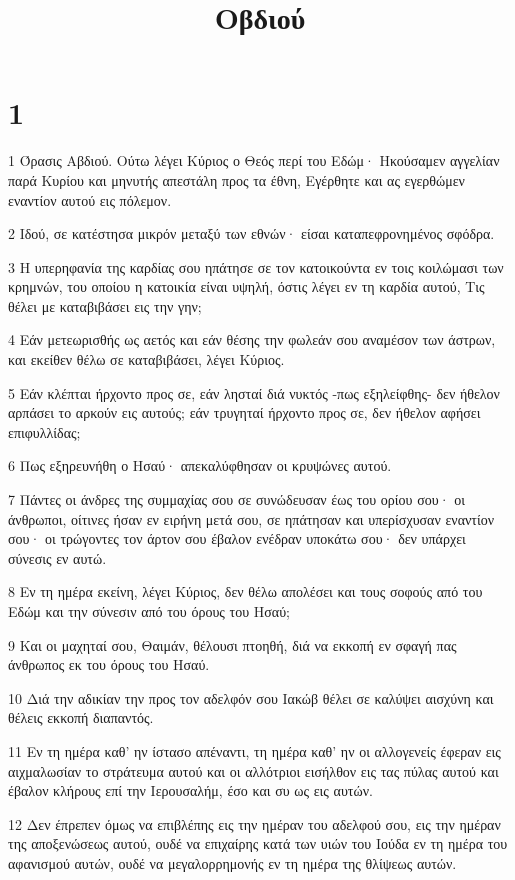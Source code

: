 

\title{Οβδιού}


\chapter{1}

\par 1 Όρασις Αβδιού. Ούτω λέγει Κύριος ο Θεός περί του Εδώμ· Ηκούσαμεν αγγελίαν παρά Κυρίου και μηνυτής απεστάλη προς τα έθνη, Εγέρθητε και ας εγερθώμεν εναντίον αυτού εις πόλεμον.
\par 2 Ιδού, σε κατέστησα μικρόν μεταξύ των εθνών· είσαι καταπεφρονημένος σφόδρα.
\par 3 Η υπερηφανία της καρδίας σου ηπάτησε σε τον κατοικούντα εν τοις κοιλώμασι των κρημνών, του οποίου η κατοικία είναι υψηλή, όστις λέγει εν τη καρδία αυτού, Τις θέλει με καταβιβάσει εις την γην;
\par 4 Εάν μετεωρισθής ως αετός και εάν θέσης την φωλεάν σου αναμέσον των άστρων, και εκείθεν θέλω σε καταβιβάσει, λέγει Κύριος.
\par 5 Εάν κλέπται ήρχοντο προς σε, εάν λησταί διά νυκτός -πως εξηλείφθης- δεν ήθελον αρπάσει το αρκούν εις αυτούς; εάν τρυγηταί ήρχοντο προς σε, δεν ήθελον αφήσει επιφυλλίδας;
\par 6 Πως εξηρευνήθη ο Ησαύ· απεκαλύφθησαν οι κρυψώνες αυτού.
\par 7 Πάντες οι άνδρες της συμμαχίας σου σε συνώδευσαν έως του ορίου σου· οι άνθρωποι, οίτινες ήσαν εν ειρήνη μετά σου, σε ηπάτησαν και υπερίσχυσαν εναντίον σου· οι τρώγοντες τον άρτον σου έβαλον ενέδραν υποκάτω σου· δεν υπάρχει σύνεσις εν αυτώ.
\par 8 Εν τη ημέρα εκείνη, λέγει Κύριος, δεν θέλω απολέσει και τους σοφούς από του Εδώμ και την σύνεσιν από του όρους του Ησαύ;
\par 9 Και οι μαχηταί σου, Θαιμάν, θέλουσι πτοηθή, διά να εκκοπή εν σφαγή πας άνθρωπος εκ του όρους του Ησαύ.
\par 10 Διά την αδικίαν την προς τον αδελφόν σου Ιακώβ θέλει σε καλύψει αισχύνη και θέλεις εκκοπή διαπαντός.
\par 11 Εν τη ημέρα καθ' ην ίστασο απέναντι, τη ημέρα καθ' ην οι αλλογενείς έφεραν εις αιχμαλωσίαν το στράτευμα αυτού και οι αλλότριοι εισήλθον εις τας πύλας αυτού και έβαλον κλήρους επί την Ιερουσαλήμ, έσο και συ ως εις αυτών.
\par 12 Δεν έπρεπεν όμως να επιβλέπης εις την ημέραν του αδελφού σου, εις την ημέραν της αποξενώσεως αυτού, ουδέ να επιχαίρης κατά των υιών του Ιούδα εν τη ημέρα του αφανισμού αυτών, ουδέ να μεγαλορρημονής εν τη ημέρα της θλίψεως αυτών.

